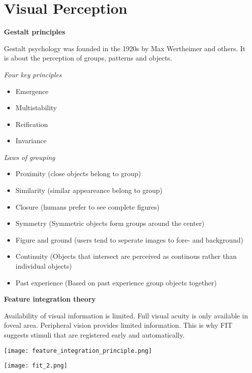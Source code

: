 \section{Visual Perception}

\textbf{Gestalt principles}


Gestalt psychology was founded in the 1920s by Max Wertheimer and others. It is about the perception of groups, patterns and objects. \medskip

\textit{Four key principles}
\begin{multicols}{2}
    \begin{itemize}[itemsep=-5pt, topsep=0pt, leftmargin=*]
        \item Emergence
        \item Multistability
        \item Reification
        \item Invariance
    \end{itemize}
\end{multicols}

\textit{Laws of grouping}
\begin{itemize}[itemsep=-5pt, topsep=0pt, leftmargin=*]
    \item Proximity (close objects belong to group)
    \item Similarity (similar appeareance belong to group)
    \item Closure (humans prefer to see complete figures)
    \item Symmetry (Symmetric objects form groups around the center)
    \item Figure and ground (users tend to seperate images to fore- and background)
    \item Continuity (Objects that intersect are perceived as continous rather than individual objects)
    \item Past experience (Based on past experience group objects together)
\end{itemize}
\medskip

\textbf{Feature integration theory} \smallskip

Availability of visual information is limited. Full visual acuity is only available in foveal area. Peripheral vision provides limited information. 
This is why FIT suggests stimuli that are registered early and automatically. 

\begin{center}
	\texttt{[image: feature\_integration\_principle.png]}
\end{center}
\begin{center}
	\texttt{[image: fit\_2.png]}
\end{center}


